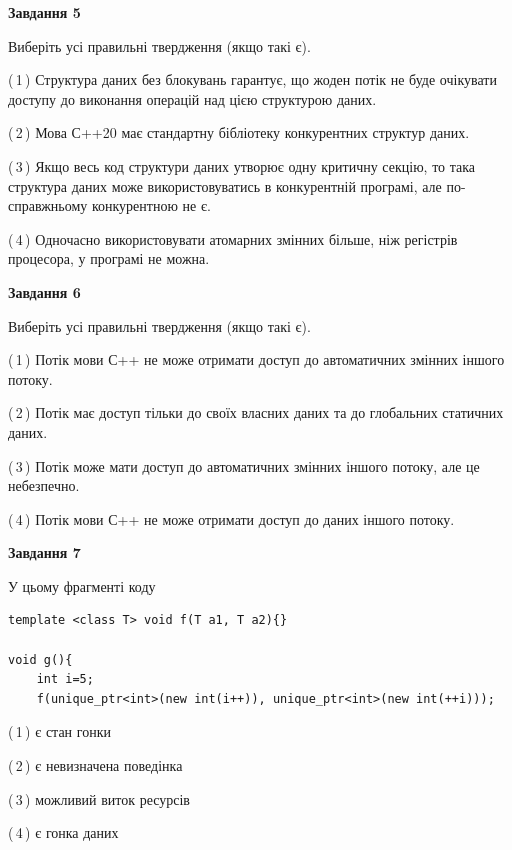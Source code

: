 \documentclass[12pt, ukrainian]{article}
\begin{document}
\begin {large}
{\begin{center}
\textbf{Завдання 5}
\end{center}

Виберіть усі правильні твердження (якщо такі є).\par
\vspace{2mm}

(\,1\,) Структура даних без блокувань гарантує, що жоден потік не буде очікувати доступу до виконання операцій над цією структурою даних.%

(\,2\,) Мова С++20 має стандартну бібліотеку конкурентних структур даних.%

(\,3\,) Якщо весь код структури даних утворює одну критичну секцію, то така структура даних може використовуватись в конкурентній програмі, але по-справжньо\-му конкурентною не є.%

(\,4\,) Одночасно використовувати атомарних змінних більше, ніж регістрів процесора, у програмі не можна.%
\newpage


\begin{center}
\textbf{Завдання 6}
\end{center}

Виберіть усі правильні твердження (якщо такі є).\par
\vspace{2mm}

(\,1\,) Потік мови С++ не може отримати доступ до автоматичних змінних іншого потоку.%

(\,2\,) Потік має доступ тільки до своїх власних даних та до глобальних статичних даних.%

(\,3\,) Потік може мати доступ до автоматичних змінних іншого потоку, але це небезпечно.%

(\,4\,) Потік мови С++ не може отримати доступ до даних іншого потоку.%


\begin{center}
\textbf{Завдання 7}
\end{center}

У цьому фрагменті коду
\begin{verbatim}
template <class T> void f(T a1, T a2){}

void g(){
    int i=5;
    f(unique_ptr<int>(new int(i++)), unique_ptr<int>(new int(++i)));
\end{verbatim}

(\,1\,) є стан гонки%

(\,2\,) є невизначена поведінка%

(\,3\,) можливий виток ресурсів%

(\,4\,) є гонка даних%

}
\end {large}

\vspace{4mm}
\newpage
\end{document}
